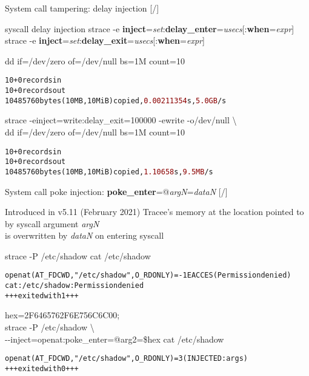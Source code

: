 \documentclass[unicode,aspectratio=169,xcolor={table,dvipsnames,usernames}]{beamer}
\begin{document}
\begin{frame}[fragile]{System call tampering: delay injection \hfill [\insertframenumber/\inserttotalframenumber]}
\begin{block}{\large syscall delay injection}
strace -e \textbf{inject}=\textit{set}:\textbf{delay\_enter}=\textit{usecs}[:\textbf{when}=\textit{expr}] \\
strace -e \textbf{inject}=\textit{set}:\textbf{delay\_exit}=\textit{usecs}[:\textbf{when}=\textit{expr}]
\end{block}

\begin{block}{\large dd if=/dev/zero of=/dev/null bs=1M count=10}
\begin{alltt}
10+0 records in
10+0 records out
10485760 bytes (10 MB, 10 MiB) copied, \textcolor{darkred}{0.00211354} s, \textcolor{darkred}{5.0 GB}/s
\end{alltt}
\end{block}

\begin{block}{\large strace -einject=write:delay\_exit=100000 -ewrite -o/dev/null \textbackslash\\
dd if=/dev/zero of=/dev/null bs=1M count=10}
\begin{alltt}
10+0 records in
10+0 records out
10485760 bytes (10 MB, 10 MiB) copied, \textcolor{darkred}{1.10658} s, \textcolor{darkred}{9.5 MB}/s
\end{alltt}
\end{block}
\end{frame}

\begin{frame}[fragile]{System call poke injection: \textbf{poke\_enter}=@\textit{argN}=\textit{dataN} \hfill [\insertframenumber/\inserttotalframenumber]}
\large
\begin{block}{Introduced in v5.11 (February 2021)}
Tracee's memory at the location pointed to by syscall argument \textit{argN} \\ is overwritten by \textit{dataN} on entering syscall
\end{block}

\begin{block}{strace -P /etc/shadow cat /etc/shadow}
\begin{alltt}
openat(AT_FDCWD, "/etc/shadow", O_RDONLY) = -1 EACCES (Permission denied)
cat: /etc/shadow: Permission denied
+++ exited with 1 +++
\end{alltt}
\end{block}

\begin{block}{hex=2F6465762F6E756C6C00; \\ strace -P /etc/shadow \textbackslash \\ -{}-inject=openat:poke\_enter=@arg2=\$hex cat /etc/shadow}
\begin{alltt}
openat(AT_FDCWD, "/etc/shadow", O_RDONLY) = 3 (INJECTED: args)
+++ exited with 0 +++
\end{alltt}
\end{block}
\end{frame}
\end{document}
